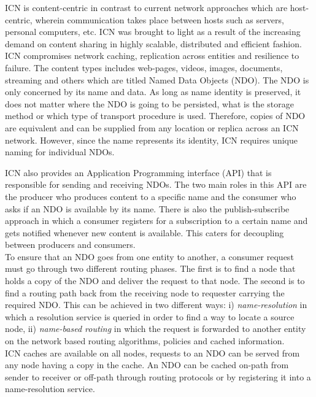  		 
\noindent ICN  is content-centric in contrast to current network approaches which are  host-centric, wherein communication takes place between hosts such as servers, personal computers, etc. ICN was brought to light as a result of the increasing demand on content sharing in highly scalable, distributed and efficient fashion. ICN compromises network caching, replication across entities and resilience to failure. The content types includes web-pages, videos, images, documents, streaming and others which are titled Named Data Objects (NDO). The NDO is only concerned by its name and data. As long as name identity is preserved, it does not matter where the NDO is going to be persisted, what is the storage method or which type of transport procedure is used. Therefore, copies of NDO are equivalent and can be supplied from any location or replica across an ICN network. However, since the name represents its identity, ICN requires unique naming for individual NDOs.

ICN also provides an Application Programming interface (API) that is responsible for sending and receiving NDOs. The two main roles in this API are the producer who produces content to a specific name and the consumer who asks if an NDO is available by its name. There is also the publish-subscribe approach in which a consumer registers for a subscription to a certain name and gets notified whenever new content is available. This caters for  decoupling between producers and consumers.\\

\noindent To ensure that an NDO goes from one entity to another, a consumer request must go through two different routing phases. The first is to find a node that holds a copy of the  NDO
and deliver the request to that node. The second is to find a routing path back from the receiving node to requester carrying the required NDO. This can be achieved in two different ways: i) \textit{name-resolution} in which a resolution service is queried in order to find a way to locate a source node, ii) \textit{name-based routing} in which the request is forwarded to	 another entity on the network based routing algorithms, policies and cached information. \\

\noindent ICN caches are available on all nodes, requests to an NDO can be served from any node having a copy in the cache. An NDO can be cached on-path from sender to receiver or off-path through routing protocols or by registering it into a name-resolution service\cite{6231276}.


